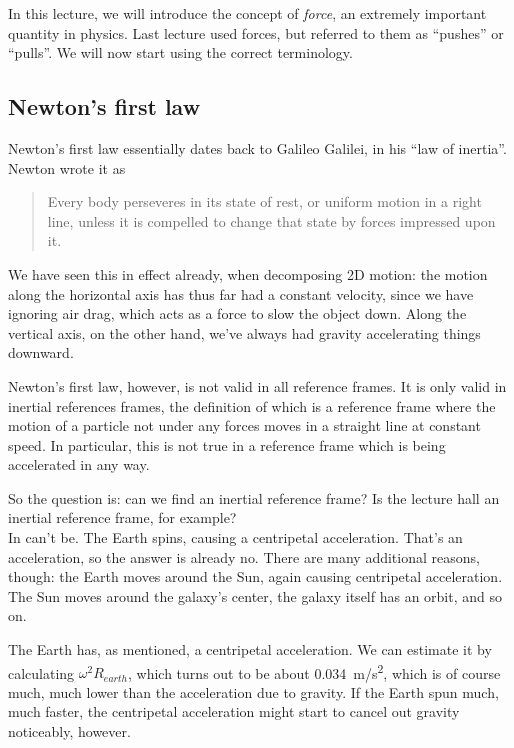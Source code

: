 In this lecture, we will introduce the concept of \emph{force}, an extremely important quantity in physics. Last lecture used forces, but referred to them as ``pushes'' or ``pulls''. We will now start using the correct terminology.

\subsection{Newton's first law}

Newton's first law essentially dates back to Galileo Galilei, in his ``law of inertia''.\\
Newton wrote it as

\begin{quote}
Every body perseveres in its state of rest, or uniform motion in a right line, unless it is compelled to change that state by forces impressed upon it.
\end{quote}

We have seen this in effect already, when decomposing 2D motion: the motion along the horizontal axis has thus far had a constant velocity, since we have ignoring air drag, which acts as a force to slow the object down. Along the vertical axis, on the other hand, we've always had gravity accelerating things downward.

Newton's first law, however, is not valid in all reference frames. It is only valid in inertial references frames, the definition of which is a reference frame where the motion of a particle not under any forces moves in a straight line at constant speed. In particular, this is not true in a reference frame which is being accelerated in any way.

So the question is: can we find an inertial reference frame? Is the lecture hall an inertial reference frame, for example?\\
In can't be. The Earth spins, causing a centripetal acceleration. That's an acceleration, so the answer is already no. There are many additional reasons, though: the Earth moves around the Sun, again causing centripetal acceleration. The Sun moves around the galaxy's center, the galaxy itself has an orbit, and so on.

The Earth has, as mentioned, a centripetal acceleration. We can estimate it by calculating $\omega^2 R_{earth}$, which turns out to be about \SI{0.034}{m/s^2}, which is of course much, much lower than the acceleration due to gravity. If the Earth spun much, much faster, the centripetal acceleration might start to cancel out gravity noticeably, however.

